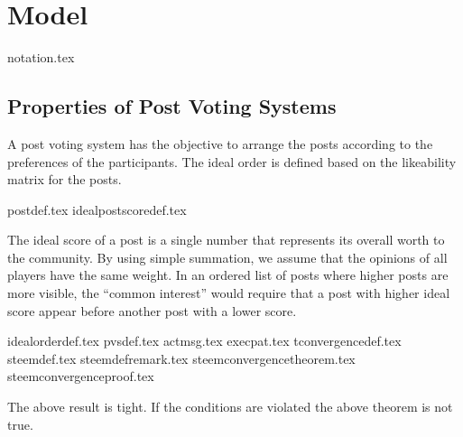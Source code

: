 \section{Model}
  {notation.tex}
  \subsection{Properties of Post Voting Systems}
    A post voting system has the objective to arrange the posts according to the
    preferences of the participants. The ideal order is defined based on the
    likeability matrix for the posts.

    {postdef.tex}
    {idealpostscoredef.tex}

    The ideal score of a post is a single number that represents its overall
    worth to the community. By using simple summation, we assume that the
    opinions of all players have the same weight. In an ordered list of posts
    where higher posts are more visible, the ``common interest'' would require
    that a post with higher ideal score appear before another post with a lower
    score.

    {idealorderdef.tex}
    {pvsdef.tex}
    {actmsg.tex}
    {execpat.tex}
    {tconvergencedef.tex}
    {steemdef.tex}
    {steemdefremark.tex}
    {steemconvergencetheorem.tex}
    {steemconvergenceproof.tex}

    The above result is tight.
    If the conditions are violated the above theorem is not true.
